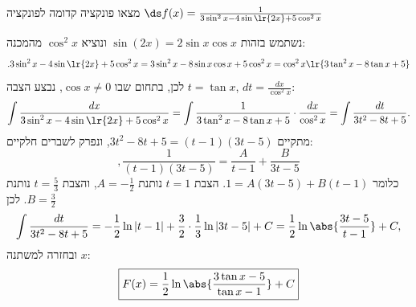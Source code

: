 מצאו פונקציה קדומה לפונקציה
$\ds f(x)=\frac{1}{3\sin^{2}x-4\sin\lr{2x}+5\cos^{2}x}$
\begin{solbox}
\unverified
נשתמש בזהות
$\sin(2x)=2\sin x\cos x$
ונוציא
$\cos^2x$
מהמכנה:
$$.3\sin^{2}x-4\sin\lr{2x}+5\cos^{2}x=3\sin^2x-8\sin x\cos x+5\cos^2x=\cos^2x\lr{3\tan^2x-8\tan x+5}$$
לכן, בתחום שבו
$\cos x\neq0$,
נבצע הצבה
$t=\tan x$,
$dt=\frac{dx}{\cos^2x}$:
\begin{align*}
\int\frac{dx}{3\sin^{2}x-4\sin\lr{2x}+5\cos^{2}x}
=\int\frac{1}{3\tan^2x-8\tan x+5}\cdot\frac{dx}{\cos^2x}
=\int\frac{dt}{3t^2-8t+5}.
\end{align*}
מתקיים
$3t^2-8t+5=(t-1)(3t-5)$,
ונפרק לשברים חלקיים:
$$,\frac{1}{(t-1)(3t-5)}=\frac{A}{t-1}+\frac{B}{3t-5}$$
כלומר
$1=A(3t-5)+B(t-1)$.
הצבת
$t=1$
נותנת
$A=-\frac12$,
והצבת
$t=\frac53$
נותנת
$B=\frac32$.
לכן
\begin{align*}
\int\frac{dt}{3t^2-8t+5}=-\frac12\ln|t-1|+\frac32\cdot\frac13\ln|3t-5|+C=\frac12\ln\abs{\frac{3t-5}{t-1}}+C,
\end{align*}
ובחזרה למשתנה
$x$:
\begin{align*}
\boxed{F(x)=\frac12\ln\abs{\frac{3\tan x-5}{\tan x-1}}+C}
\end{align*}
\end{solbox}
